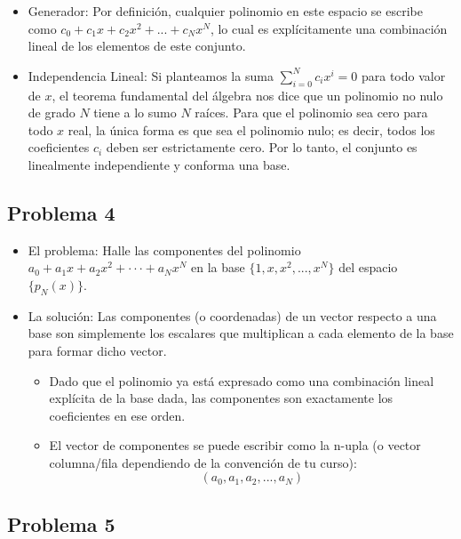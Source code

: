 \documentclass[11pt,spanish]{article}
\newcounter{problema}
\begin{document}
\begin{itemize}
\begin{itemize}
\begin{itemize}
\item Generador: Por definición, cualquier polinomio en este espacio se escribe como $c_{0} + c_{1}x + c_{2}x^{2} + ... + c_{N}x^{N}$, lo cual es explícitamente una combinación lineal de los elementos de este conjunto.

\item Independencia Lineal: Si planteamos la suma $\sum_{i=0}^{N} c_{i}x^{i} = 0$ para todo valor de $x$, el teorema fundamental del álgebra nos dice que un polinomio no nulo de grado $N$ tiene a lo sumo $N$ raíces. Para que el polinomio sea cero para todo $x$ real, la única forma es que sea el polinomio nulo; es decir, todos los coeficientes $c_{i}$ deben ser estrictamente cero. Por lo tanto, el conjunto es linealmente independiente y conforma una base.
\end{itemize}
\end{itemize}
\end{itemize}

\subsection*{Problema 4}

\begin{itemize}
\item El problema: Halle las componentes del polinomio $a_{0}+a_{1}x+a_{2}x^{2}+\cdot\cdot\cdot+a_{N}x^{N}$ en la base $\{1,x,x^{2},...,x^{N}\}$ del espacio $\{p_{N}(x)\}$.

\item La solución: Las componentes (o coordenadas) de un vector respecto a una base son simplemente los escalares que multiplican a cada elemento de la base para formar dicho vector.
\begin{itemize}
\item Dado que el polinomio ya está expresado como una combinación lineal explícita de la base dada, las componentes son exactamente los coeficientes en ese orden.
\item El vector de componentes se puede escribir como la n-upla (o vector columna/fila dependiendo de la convención de tu curso):
$$(a_{0}, a_{1}, a_{2}, ..., a_{N})$$
\end{itemize}
\end{itemize}

\subsection*{Problema 5}
\end{document}
